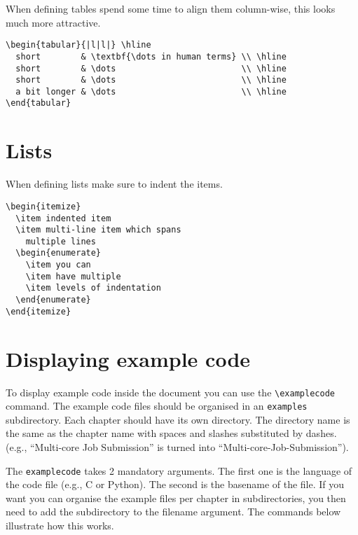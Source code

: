 \documentclass[11pt,a4paper]{article}
\begin{document}
When defining tables spend some time to align them column-wise, this looks much more attractive.

\begin{verbatim}
\begin{tabular}{|l|l|} \hline
  short        & \textbf{\dots in human terms} \\ \hline
  short        & \dots                         \\ \hline
  short        & \dots                         \\ \hline
  a bit longer & \dots                         \\ \hline
\end{tabular}
\end{verbatim}

\section{Lists}
\label{sec:lists}

When defining lists make sure to indent the items.

\begin{verbatim}
\begin{itemize}
  \item indented item
  \item multi-line item which spans
    multiple lines
  \begin{enumerate}
    \item you can
    \item have multiple
    \item levels of indentation
  \end{enumerate}
\end{itemize}
\end{verbatim}

\section{Displaying example code}
\label{sec:displaying-example-code}

To display example code inside the document you can use the \lstinline|\examplecode|
command. The example code files should be organised in an \lstinline|examples|
subdirectory.  Each chapter should have its own directory. The directory name
is the same as the chapter name with spaces and slashes substituted by dashes.
(e.g., ``Multi-core Job Submission'' is turned into
``Multi-core-Job-Submission'').

The \lstinline|examplecode| takes 2 mandatory arguments. The first one is the
language of the code file (e.g., C or Python). The second is the basename of the
file. If you want you can organise the example files per chapter in
subdirectories, you then need to add the subdirectory to the filename argument.
The commands below illustrate how this works.
\end{document}
